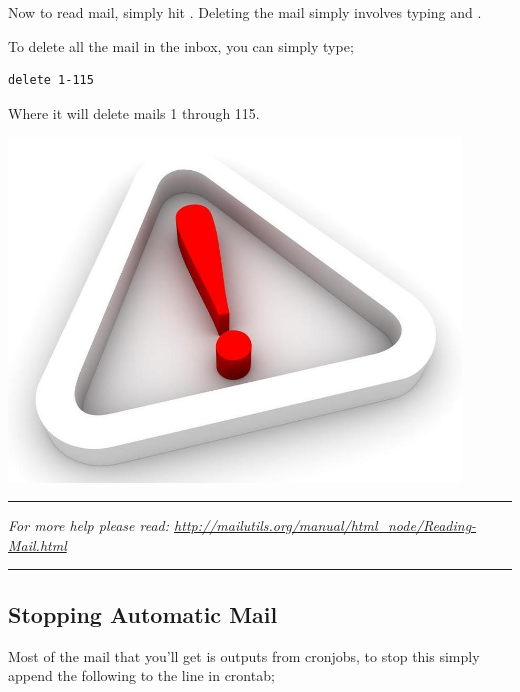 Now to read mail, simply hit \keys{\enter}.  Deleting the mail simply involves typing  and .

To delete all the mail in the inbox, you can simply type;

\begin{lstlisting}
delete 1-115
\end{lstlisting}

Where it will delete mails 1 through 115.

\vspace*{0.5cm}
\begin{minipage}{0.3\textwidth}
\begin{flushleft} 
\includegraphics[width=0.9\textwidth]{./supportfiles/point.jpg}
\end{flushleft}
\end{minipage}
\begin{minipage}{0.6\textwidth}
\begin{flushright}
\hrule
\vspace*{0.25cm}
\textit{For more help please read: \url{http://mailutils.org/manual/html_node/Reading-Mail.html}}
\vspace{0.25cm}
\hrule
\end{flushright}
\end{minipage}
\vspace*{0.5cm}



\subsection{Stopping Automatic Mail}

Most of the mail that you'll get is outputs from cronjobs, to stop this simply append the following to the line in crontab;

